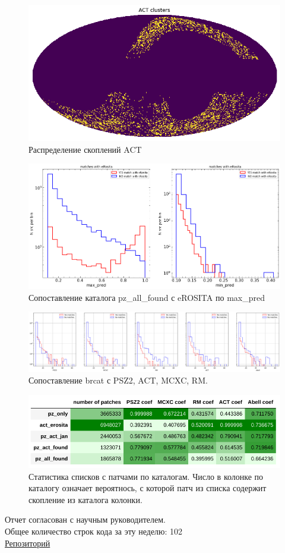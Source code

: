\documentclass{article}
\begin{document}
\begin{figure}[h]
\includegraphics[width=0.6\linewidth]{act_map}
\caption{Распределение скоплений ACT}
\label{Fig:ACT}
\end{figure}

\begin{figure}[h]
\includegraphics[width=0.8\linewidth]{ancat_erosita_histogram}
\caption{Сопоставление каталога pz\_all\_found с eROSITA по max\_pred}
\label{Fig:Erosita}
\end{figure}

\begin{figure}[h]
\includegraphics[width=0.8\linewidth]{brcat_histogram}
\caption{Сопоставление brcat с PSZ2, ACT, MCXC, RM.}
\label{Fig:Brcat}
\end{figure}

\begin{figure}[h]
\includegraphics[width=0.6\linewidth]{patch_stat}
\caption{Статистика списков с патчами по каталогам. Число в колонке по каталогу означает вероятнось,
    с которой патч из списка содержит скопление из каталога колонки.}
\label{Fig:Patches}
\end{figure}
Отчет согласован с научным руководителем.\\
Общее количество строк кода за эту неделю: 102\\
\href{https://github.com/rt2122/data-segmentation-2}{Репозиторий}\\ 
\end{document}
